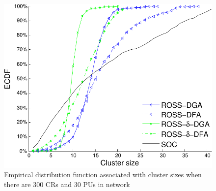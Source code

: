 \documentclass[times]{ettauth}
\theoremstyle{mytheoremstyle}
\theoremstyle{mytheoremstyle}
\theoremstyle{mytheoremstyle}
\begin{document}
\begin{figure}[t]
\begin{multicols}{3}
    \includegraphics[width=\linewidth]{cdf_clusterSize_300.pdf}\par\caption{Empirical distribution function associated with cluster sizes when there are 300 CRs  and 30 PUs in network}\label{cdf_clusterSize_300}
\end{multicols}
\end{figure}
\end{document}
